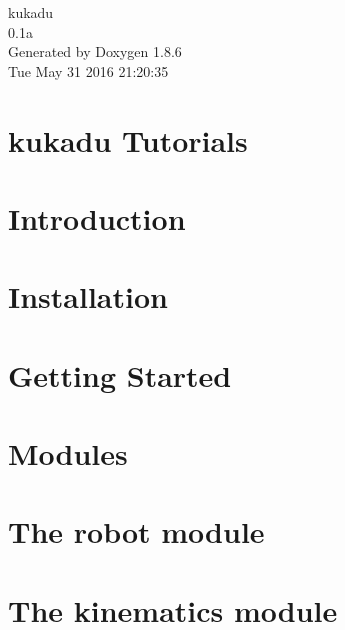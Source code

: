 \documentclass[twoside]{book}
\newcommand{\clearemptydoublepage}{%
  \newpage{\pagestyle{empty}\cleardoublepage}%
}
\begin{document}
\hypersetup{pageanchor=false}
\begin{titlepage}
\vspace*{7cm}
\begin{center}%
{\Large kukadu \\[1ex]\large 0.\-1a }\\
\vspace*{1cm}
{\large Generated by Doxygen 1.8.6}\\
\vspace*{0.5cm}
{\small Tue May 31 2016 21:20:35}\\
\end{center}
\end{titlepage}
\clearemptydoublepage
\tableofcontents
\clearemptydoublepage
{}
\hypersetup{pageanchor=true}

\chapter{kukadu Tutorials}
\label{index}\hypertarget{index}{}
\chapter{Introduction}
\label{introductionpage}
\hypertarget{introductionpage}{}

\chapter{Installation}
\label{installationpage}
\hypertarget{installationpage}{}

\chapter{Getting Started}
\label{gettingstartedpage}
\hypertarget{gettingstartedpage}{}

\chapter{Modules}
\label{modulespage}
\hypertarget{modulespage}{}

\chapter{The robot module}
\label{robotpage}
\hypertarget{robotpage}{}

\chapter{The kinematics module}
\label{kinematicspage}
\hypertarget{kinematicspage}{}

\end{document}
